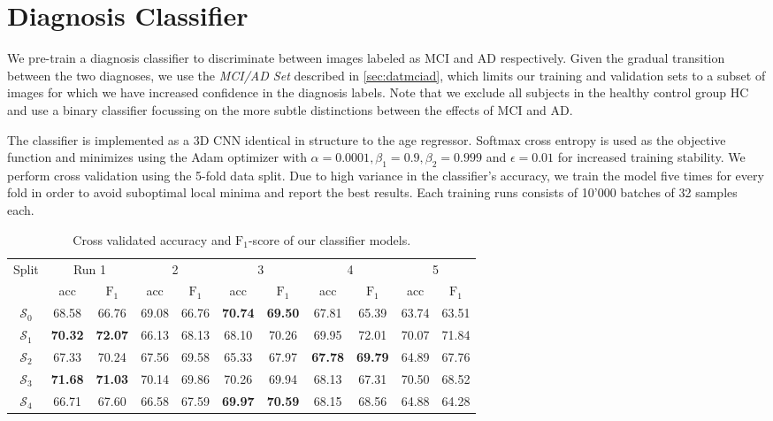 \section{Diagnosis Classifier}
\label{sec:expdxclf}
We pre-train a diagnosis classifier to discriminate between images labeled as MCI and AD respectively. Given the gradual transition between the two diagnoses, we use the \textit{MCI/AD Set} described in \autoref{sec:datmciad}, which limits our training and validation sets to a subset of images for which we have increased confidence in the diagnosis labels. Note that we exclude all subjects in the healthy control group HC and use a binary classifier focussing on the more subtle distinctions between the effects of MCI and AD.

The classifier is implemented as a 3D CNN identical in structure to the age regressor. Softmax cross entropy is used as the objective function and minimizes using the Adam optimizer with $\alpha = 0.0001, \beta_1 = 0.9, \beta_2 = 0.999$ and $\epsilon = 0.01$ for increased training stability.
We perform cross validation using the 5-fold data split. Due to high variance in the classifier's accuracy, we train the model five times for every fold in order to avoid suboptimal local minima and report the best results. Each training runs consists of 10'000 batches of 32 samples each.

\begin{table}[h]
	\begin{center}
		\begin{tabular}{c c c c c c c c c c c}
			\toprule
			\multirow{2}{*}{Split} & 
			\multicolumn{2}{c}{Run 1} & 
			\multicolumn{2}{c}{2} & 
			\multicolumn{2}{c}{3} & 
			\multicolumn{2}{c}{4} & 
			\multicolumn{2}{c}{5} \\
			\cmidrule(lr){2-3}
			\cmidrule(lr){4-5}
			\cmidrule(lr){6-7}
			\cmidrule(lr){8-9}
			\cmidrule(lr){10-11}
			 & acc & $\text{F}_1$ & acc & $\text{F}_1$ & acc & $\text{F}_1$ & acc & $\text{F}_1$ & acc & $\text{F}_1$ \\ 
			\cmidrule(lr){1-11}
			$\mathcal{S}_0$ & 68.58 & 66.76 & 69.08 & 66.76 & \textbf{70.74} & \textbf{69.50} & 67.81 & 65.39 & 63.74 & 63.51 \\
			$\mathcal{S}_1$ & \textbf{70.32} & \textbf{72.07} & 66.13 & 68.13 & 68.10 & 70.26 & 69.95 & 72.01 & 70.07 & 71.84 \\
			$\mathcal{S}_2$ & 67.33 & 70.24 & 67.56 & 69.58 & 65.33 & 67.97 & \textbf{67.78} & \textbf{69.79} & 64.89 & 67.76 \\
			$\mathcal{S}_3$ & \textbf{71.68} & \textbf{71.03} & 70.14 & 69.86 & 70.26 & 69.94 & 68.13 & 67.31 & 70.50 & 68.52 \\
			$\mathcal{S}_4$ & 66.71 & 67.60 & 66.58 & 67.59 & \textbf{69.97} & \textbf{70.59} & 68.15 & 68.56 & 64.88 & 64.28 \\
			\bottomrule
		\end{tabular}
		\caption{Cross validated accuracy and $\text{F}_1$-score of our classifier models.}
		\label{tab:clfcrossval}
	\end{center}
\end{table} %

